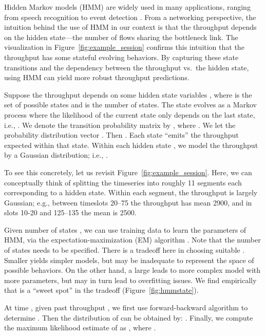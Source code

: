 Hidden Markov models (HMM) are widely used in many applications, ranging from
speech recognition to event detection \cite{bishop2006pattern}. From a
networking perspective, the intuition behind the use of HMM in our context is
that the throughput depends on the hidden state---the number of flows
sharing the bottleneck link.  The visualization in
Figure~\ref{fig:example_session} confirms this intuition that the throughput
has some stateful evolving behaviors.  By capturing these state transitions and
the dependency between the throughput vs.\ the hidden state, using HMM can
yield more robust throughput predictions.

 Suppose the throughput depends on some hidden
state variables , where  is the
set of possible states and  is the number of states.  The state
evolves as a Markov process where the likelihood of the current state only
depends on the last state, i.e., . We denote the transition probability matrix by
, where .  We let the
probability distribution vector .  Then .  Each state ``emits''
the throughput expected within that state. Within each  hidden state
, we model  the  throughput  by a  Gaussian distribution; i.e., .

To see this concretely, let us revisit Figure~\ref{fig:example_session}.  Here,
we can conceptually think of splitting the timeseries into roughly 11
 segments each corresponding to a hidden  state.  Within each segment, the
throughput is largely Gaussian;  e.g., between timeslots 20--75 the throughput
has mean 2900, and in slots 10-20 and 125--135 the mean is  2500.

 Given number of states , we can  use training data
to  learn the parameters of HMM,  via the expectation-maximization (EM) algorithm
\cite{bishop2006pattern}.  Note that the number of states  needs to be
specified. There is a tradeoff here in choosing suitable .  Smaller 
yields simpler models, but may be inadequate to represent the space of possible
behaviors.  On the other hand, a large  leads to more complex model with
more parameters, but may in turn lead to overfitting issues.   We find
empirically that  is a ``sweet spot'' in the tradeoff (Figure~\ref{fig:hmmstate}).

 At time , given past throughput , we first use
forward-backward algorithm \cite{bishop2006pattern} to determine
. Then the distribution of  can be
obtained by: . Finally, we compute
 the maximum likelihood estimate of   as
, where .




